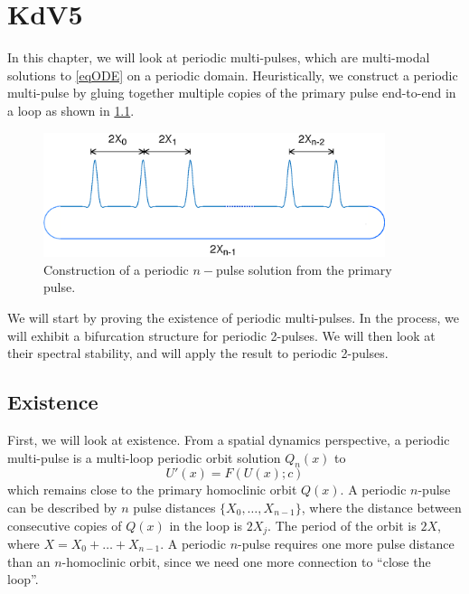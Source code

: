 \documentclass[thesis.tex]{subfiles}
\begin{document}
\iffulldocument\else
	\chapter{KdV5}
\fi

In this chapter, we will look at periodic multi-pulses, which are multi-modal solutions to \cref{eqODE} on a periodic domain. Heuristically, we construct a periodic multi-pulse by gluing together multiple copies of the primary pulse end-to-end in a loop as shown in \cref{fig:permultipulse}.
\begin{figure}
\begin{center}
\includegraphics[width=10cm]{periodic/multipulseperiodic}
\end{center}
\caption[Construction of a periodic $n-$pulse solution]{Construction of a periodic $n-$pulse solution from the primary pulse.}
\label{fig:permultipulse}
\end{figure}
We will start by proving the existence of periodic multi-pulses. In the process, we will exhibit a bifurcation structure for periodic 2-pulses. We will then look at their spectral stability, and will apply the result to periodic 2-pulses.

\section{Existence}\label{sec:perexist}

First, we will look at existence. From a spatial dynamics perspective, a periodic multi-pulse is a multi-loop periodic orbit solution $Q_n(x)$ to
\begin{equation}\label{existgenODE}
U'(x) = F(U(x); c)
\end{equation}
which remains close to the primary homoclinic orbit $Q(x)$. A periodic $n$-pulse can be described by $n$ pulse distances $\{X_0, \dots, X_{n-1} \}$, where the distance between consecutive copies of $Q(x)$ in the loop is $2 X_j$. The period of the orbit is $2X$, where $X = X_0 + \dots + X_{n-1}$. A periodic $n$-pulse requires one more pulse distance than an $n$-homoclinic orbit, since we need one more connection to ``close the loop''.  
\end{document}
